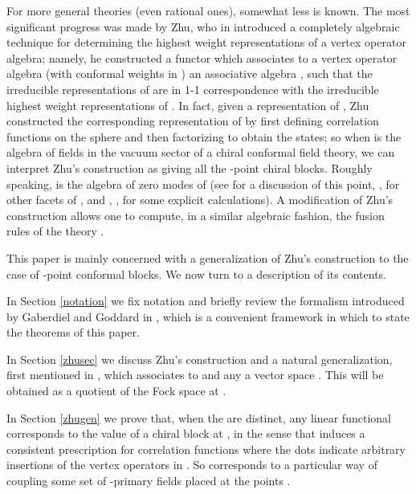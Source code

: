 \documentclass[a4paper,12pt]{article}
\providecommand{\N}{{\mathbb N}}
\providecommand{\uu}{{\mathbf u}}
\providecommand{\PP}{{\mathbb P}}
\providecommand{\IP}[1]{\langle#1\rangle}
\begin{document}
For more general theories (even rational ones), somewhat less is known.
The most significant progress was made by Zhu,
who in \cite{Zhu} introduced a completely algebraic technique for determining the highest weight representations of
a vertex operator algebra; namely, he constructed a functor which associates to a vertex operator
algebra \coordHE{} (with conformal weights in \myHighlight{$\N$}\coordHE{}) 
an associative algebra \coordHE{},
such that the irreducible representations of \coordHE{} are in 1-1 correspondence
with the irreducible highest weight representations of \coordHE{}.  In fact, given a representation of \coordHE{},
Zhu constructed the corresponding representation
of \coordHE{} by first defining correlation functions on the sphere and then factorizing to obtain the states;
so when \coordHE{} is the algebra of fields in the vacuum sector of a chiral conformal field theory, we can interpret
Zhu's construction as giving all the \coordHE{}-point chiral blocks.
Roughly speaking, \coordHE{} is the algebra of zero
modes of \coordHE{} (see \cite{NB} for a discussion of this point, \cite{DLM}, \cite{Li} for other
facets of \coordHE{}, and \cite{FZ}, \cite{Lucke}, \cite{DLM2} for some explicit calculations).
A modification of Zhu's construction allows one
to compute, in a similar algebraic fashion, the fusion rules of the
theory \cite{FZ}.

This paper is mainly concerned with a generalization of Zhu's construction
to the case of \coordHE{}-point conformal blocks.  
We now turn to a description of its contents.

In Section \ref{notation} we fix notation
and briefly review the formalism introduced by Gaberdiel and Goddard in
\cite{GG}, which is a convenient framework in which to state the theorems
of this paper.

In Section \ref{zhusec} we discuss Zhu's construction and a natural generalization, 
first mentioned in \cite{GG},
which associates to \coordHE{} and any \myHighlight{$\uu = (u_1, \dots, u_k) \in \PP^k$}\coordHE{} a vector space \myHighlight{$A_\uu$}\coordHE{}.  This \myHighlight{$A_\uu$}\coordHE{} will be
obtained as a quotient of the Fock space at \myHighlight{$0 \in \PP$}\coordHE{}.

In Section \ref{zhugen} we prove that, when the \coordHE{} are distinct, any linear functional \myHighlight{$\eta \in (A_\uu)^*$}\coordHE{} 
corresponds to the value of
a chiral block at \myHighlight{$\uu$}\coordHE{}, in the sense that \myHighlight{$\eta$}\coordHE{} induces a consistent
prescription for correlation functions
\myHighlight{$\IP{\prod_{i=1}^k \phi_i(u_i) \cdots}$}\coordHE{}
where the dots indicate arbitrary insertions of the vertex operators in \coordHE{}.
So \myHighlight{$\eta$}\coordHE{} corresponds to a particular way of coupling some set of
\coordHE{}-primary fields \coordHE{} placed at the points \coordHE{}.
\end{document}
